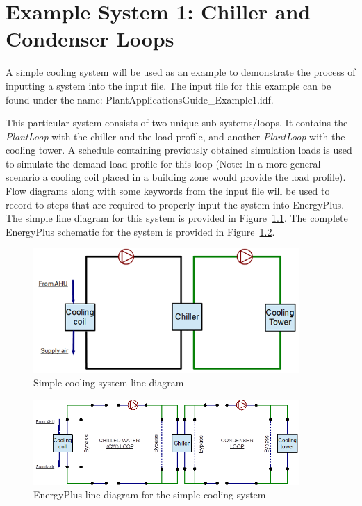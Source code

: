 \chapter{Example System 1: Chiller and Condenser Loops}\label{example-system-1-chiller-and-condenser-loops}

A simple cooling system will be used as an example to demonstrate the process of inputting a system into the input file. The input file for this example can be found under the name: PlantApplicationsGuide\_Example1.idf.

This particular system consists of two unique sub-systems/loops. It contains the \emph{PlantLoop} with the chiller and the load profile, and another \emph{PlantLoop} with the cooling tower. A schedule containing previously obtained simulation loads is used to simulate the demand load profile for this loop (Note: In a more general scenario a cooling coil placed in a building zone would provide the load profile). Flow diagrams along with some keywords from the input file will be used to record to steps that are required to properly input the system into EnergyPlus. The simple line diagram for this system is provided in Figure~\ref{fig:simple-cooling-system-line-diagram}. The complete EnergyPlus schematic for the system is provided in Figure~\ref{fig:energyplus-line-diagram}.

\begin{figure}[hbtp] %
\centering
\includegraphics[width=0.9\textwidth, height=0.9\textheight, keepaspectratio=true]{media/image012.png}
\caption{Simple cooling system line diagram \protect \label{fig:simple-cooling-system-line-diagram}}
\end{figure}


\begin{figure}[hbtp] %
\centering
\includegraphics[width=0.9\textwidth, height=0.9\textheight, keepaspectratio=true]{media/image013.png}
\caption{EnergyPlus line diagram for the simple cooling system \protect \label{fig:energyplus-line-diagram}}
\end{figure}

